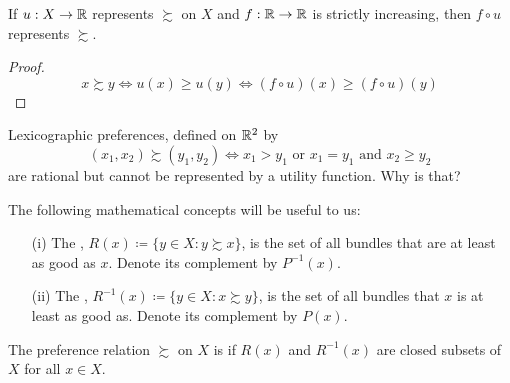 \documentclass[12pt]{article}
\begin{document}
\begin{proposition}
	If $u: X \to \mathbb{R}$ represents $\succsim$ on $X$ and $f: \mathbb{R} \to \mathbb{R}$ is strictly increasing, then $f \circ u$ represents $\succsim$.
\end{proposition}
\begin{proof}
	\[
	x \succsim y \Longleftrightarrow u(x) \ge u(y) \Longleftrightarrow (f\circ u)(x) \ge (f\circ u)(y)
	\]
\end{proof}

\begin{remark}
	Lexicographic preferences, defined on $\mathbb{R}^2$ by
	\[
	(x_1,x_2) \succsim (y_1,y_2) \Longleftrightarrow x_1 > y_1 \text{ or } x_1 = y_1 \text{ and } x_2 \ge y_2
	\]
	are rational but cannot be represented by a utility function. Why is that?
\end{remark}

\begin{definition}
	The following mathematical concepts will be useful to us:
	\begin{itemize}
		\item[(i)] The , $R(x) \coloneqq \{y \in X : y \succsim x\}$, is the set of all bundles that are at least as good as $x$. Denote its complement by $P^{-1}(x)$.
		
		\item[(ii)] The , $R^{-1}(x) \coloneqq \{y \in X : x \succsim y\}$, is the set of all bundles that $x$ is at least as good as. Denote its complement by $P(x)$.
	\end{itemize}
\end{definition}

\begin{definition}
	The preference relation $\succsim$ on $X$ is  if $R(x)$ and $R^{-1}(x)$ are closed subsets of $X$ for all $x \in X$.
\end{definition}
\end{document}
